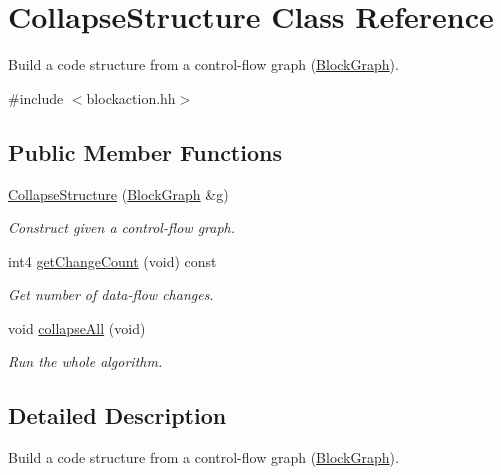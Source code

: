 \hypertarget{class_collapse_structure}{}\section{Collapse\+Structure Class Reference}
\label{class_collapse_structure}


Build a code structure from a control-\/flow graph (\mbox{\hyperlink{class_block_graph}{Block\+Graph}}).  




{\ttfamily \#include $<$blockaction.\+hh$>$}

\subsection*{Public Member Functions}
\begin{DoxyCompactItemize}
\item 
\mbox{\hyperlink{class_collapse_structure_a86b3b578cba8a83f7c75dc28e95f39e0}{Collapse\+Structure}} (\mbox{\hyperlink{class_block_graph}{Block\+Graph}} \&g)
\begin{DoxyCompactList}\small\item\em Construct given a control-\/flow graph. \end{DoxyCompactList}\item 
int4 \mbox{\hyperlink{class_collapse_structure_a075bcd360eb6a82c92689fc18f1fcc1e}{get\+Change\+Count}} (void) const
\begin{DoxyCompactList}\small\item\em Get number of data-\/flow changes. \end{DoxyCompactList}\item 
void \mbox{\hyperlink{class_collapse_structure_a5e36c78c71bf1ded2090424af870b7a0}{collapse\+All}} (void)
\begin{DoxyCompactList}\small\item\em Run the whole algorithm. \end{DoxyCompactList}\end{DoxyCompactItemize}


\subsection{Detailed Description}
Build a code structure from a control-\/flow graph (\mbox{\hyperlink{class_block_graph}{Block\+Graph}}). 

